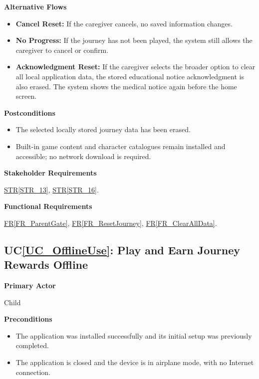 \documentclass[10pt]{article}
\newcommand{\strref}[1]{\hyperref[#1]{STR\ref*{#1}}}
\newcounter{ucnum} %
\newcommand{\ucheading}[1]{UC\ref*{#1}}
\newcommand{\rref}[1]{\hyperref[#1]{FR\ref*{#1}}}
\begin{document}
\textbf{Alternative Flows}
\begin{itemize}
    \item \textbf{Cancel Reset:} If the caregiver cancels, no
    saved information changes.
    \item \textbf{No Progress:} If the journey has not been played,
    the system still allows the caregiver to cancel or confirm.
    \item \textbf{Acknowledgment Reset:} If the caregiver selects
    the broader option to clear all local application data,
    the stored educational notice acknowledgment is also erased. The
    system shows the medical notice again before the home screen.
\end{itemize}

\textbf{Postconditions}
\begin{itemize}
    \item The selected locally stored journey data has been erased.
    \item Built-in game content and character catalogues remain
    installed and accessible; no network download is required.
\end{itemize}

\textbf{Stakeholder Requirements}

\strref{STR_13}, \strref{STR_16}.

\textbf{Functional Requirements}

\rref{FR_ParentGate}, \rref{FR_ResetJourney}, \rref{FR_ClearAllData}.

\label{UC_OfflineUse}
\subsection{\ucheading{UC_OfflineUse}: Play and Earn Journey Rewards Offline}

\textbf{Primary Actor}

Child

\textbf{Preconditions}
\begin{itemize}
    \item The application was installed successfully and its
    initial setup was previously completed.
    \item The application is closed and the device is in airplane
    mode, with no Internet connection.
\end{itemize}
\end{document}
